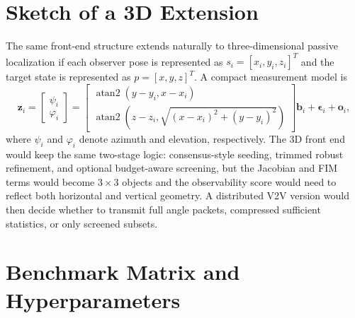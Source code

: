 \section{Sketch of a 3D Extension}
\label{app:threed}

The same front-end structure extends naturally to three-dimensional passive localization if each observer pose is represented as $s_i=[x_i,y_i,z_i]^T$ and the target state is represented as $p=[x,y,z]^T$. A compact measurement model is
\begin{equation}
\mathbf{z}_i=
\begin{bmatrix}
\psi_i\\
\varphi_i
\end{bmatrix}
=
\begin{bmatrix}
\operatorname{atan2}(y-y_i,x-x_i)\\
\operatorname{atan2}\!\left(z-z_i,\sqrt{(x-x_i)^2+(y-y_i)^2}\right)
\end{bmatrix}
\mathbf{b}_i+\boldsymbol{\epsilon}_i+\mathbf{o}_i,
\end{equation}
where $\psi_i$ and $\varphi_i$ denote azimuth and elevation, respectively. The 3D front end would keep the same two-stage logic: consensus-style seeding, trimmed robust refinement, and optional budget-aware screening, but the Jacobian and FIM terms would become $3\times 3$ objects and the observability score would need to reflect both horizontal and vertical geometry. A distributed V2V version would then decide whether to transmit full angle packets, compressed sufficient statistics, or only screened subsets.

\clearpage

\section{Benchmark Matrix and Hyperparameters}
\label{app:hyperparams}

